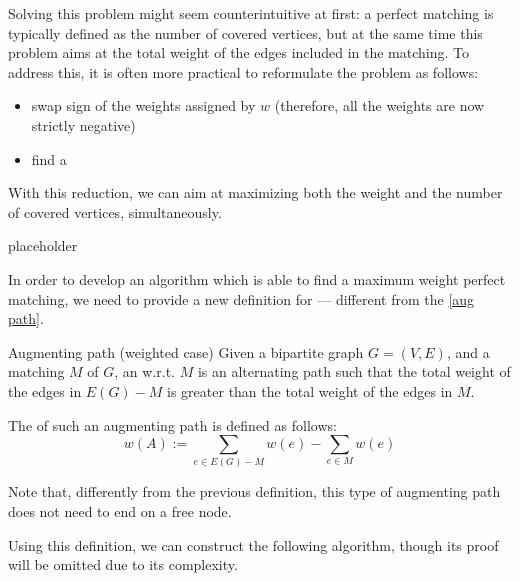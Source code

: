 \documentclass[a4paper, 12pt]{report}
\begin{document}
    Solving this problem might seem counterintuitive at first: a perfect matching is typically defined as  the number of covered vertices, but at the same time this problem aims at  the total weight of the edges included in the matching. To address this, it is often more practical to reformulate the problem as follows:

    \begin{itemize}
        \item swap sign of the weights assigned by $w$ (therefore, all the weights are now strictly negative)
        \item find a 
    \end{itemize}

    With this reduction, we can aim at maximizing both the weight and the number of covered vertices, simultaneously.

    \begin{example}
        placeholder 
    \end{example}

    In order to develop an algorithm which is able to find a maximum weight perfect matching, we need to provide a new definition for  --- different from the \cref{aug path}.

    \begin{frameddefn}{Augmenting path (weighted case)}
        Given a bipartite graph $G = (V, E)$, and a matching $M$ of $G$, an  w.r.t. $M$ is an alternating path such that the total weight of the edges in $E(G) - M$ is greater than the total weight of the edges in $M$.

        The  of such an augmenting path is defined as follows: $$w(A) := \sum_{e \in E(G) - M}{w(e)} - \sum_{e \in M}{w(e)}$$
    \end{frameddefn}

    Note that, differently from the previous definition, this type of augmenting path does not need to end on a free node.

    Using this definition, we can construct the following algorithm, though its proof will be omitted due to its complexity.
\end{document}
